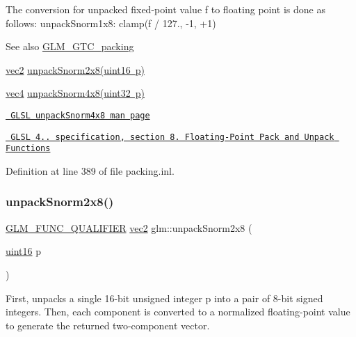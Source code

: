 The conversion for unpacked fixed-\/point value f to floating point is done as follows\+: unpack\+Snorm1x8\+: clamp(f / 127., -\/1, +1)

\begin{DoxySeeAlso}{See also}
\mbox{\hyperlink{group__gtc__packing}{G\+L\+M\+\_\+\+G\+T\+C\+\_\+packing}} 

\mbox{\hyperlink{group__core__types_gaa1618f51db67eaa145db101d8c8431d8}{vec2}} \mbox{\hyperlink{group__gtc__packing_ga27f30f0281b88e152b0895f5e2ead878}{unpack\+Snorm2x8(uint16 p)}} 

\mbox{\hyperlink{group__core__types_ga5881b1b022d7fd1b7218f5916532dd02}{vec4}} \mbox{\hyperlink{group__core__func__packing_ga4b18a0480e7260401d97f40cacd6bc36}{unpack\+Snorm4x8(uint32 p)}} 

\href{http://www.opengl.org/sdk/docs/manglsl/xhtml/unpackSnorm4x8.xml}{\texttt{ G\+L\+SL unpack\+Snorm4x8 man page}} 

\href{http://www.opengl.org/registry/doc/GLSLangSpec.4.20.8.pdf}{\texttt{ G\+L\+SL 4.. specification, section 8. Floating-\/\+Point Pack and Unpack Functions}} 
\end{DoxySeeAlso}


Definition at line 389 of file packing.\+inl.

\mbox{\label{group__gtc__packing_ga27f30f0281b88e152b0895f5e2ead878}} 
\subsubsection{\texorpdfstring{unpackSnorm2x8()}{unpackSnorm2x8()}}
{\footnotesize\ttfamily \mbox{\hyperlink{setup_8hpp_a33fdea6f91c5f834105f7415e2a64407}{G\+L\+M\+\_\+\+F\+U\+N\+C\+\_\+\+Q\+U\+A\+L\+I\+F\+I\+ER}} \mbox{\hyperlink{group__core__types_gaa1618f51db67eaa145db101d8c8431d8}{vec2}} glm\+::unpack\+Snorm2x8 (\begin{DoxyParamCaption}\item[{\mbox{\hyperlink{group__gtc__type__precision_gad8c2939e1fdd8e5828b31d95c52255d5}{uint16}}}]{p }\end{DoxyParamCaption})}

First, unpacks a single 16-\/bit unsigned integer p into a pair of 8-\/bit signed integers. Then, each component is converted to a normalized floating-\/point value to generate the returned two-\/component vector.

